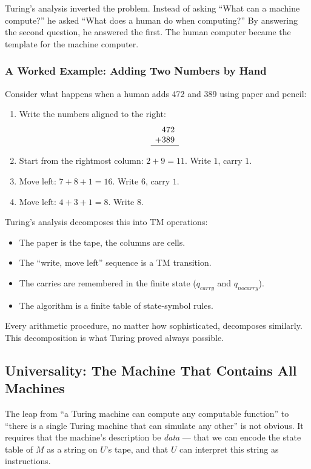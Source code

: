 Turing's analysis inverted the problem. Instead of asking ``What can a machine compute?'' he asked ``What does a human do when computing?'' By answering the second question, he answered the first. The human computer became the template for the machine computer.

\subsubsection*{A Worked Example: Adding Two Numbers by Hand}

Consider what happens when a human adds 472 and 389 using paper and pencil:

\begin{enumerate}
\item Write the numbers aligned to the right:
\[
\begin{array}{r}
  472 \\
+ 389 \\
\hline
\end{array}
\]
\item Start from the rightmost column: $2 + 9 = 11$. Write $1$, carry $1$.
\item Move left: $7 + 8 + 1 = 16$. Write $6$, carry $1$.
\item Move left: $4 + 3 + 1 = 8$. Write $8$.
\end{enumerate}

Turing's analysis decomposes this into TM operations:
\begin{itemize}
\item The paper is the tape, the columns are cells.
\item The ``write, move left'' sequence is a TM transition.
\item The carries are remembered in the finite state ($q_{carry}$ and $q_{nocarry}$).
\item The algorithm is a finite table of state-symbol rules.
\end{itemize}

Every arithmetic procedure, no matter how sophisticated, decomposes similarly. This decomposition is what Turing proved always possible.

\subsection*{Universality: The Machine That Contains All Machines}

The leap from ``a Turing machine can compute any computable function'' to ``there is a single Turing machine that can simulate any other'' is not obvious. It requires that the machine's description be \emph{data} --- that we can encode the state table of $M$ as a string on $U$'s tape, and that $U$ can interpret this string as instructions.

